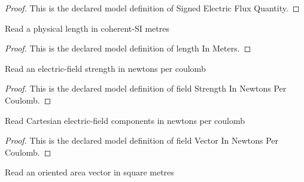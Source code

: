 \begin{proof}
  This is the declared model definition of Signed Electric Flux Quantity.
\end{proof}
\begin{definition}
  \label{def:physics:phyx-mini-0851:phyxminiproblems-problemphyxmini0851-lengthinmeters}
  Read a physical length in coherent-SI metres
\end{definition}
\begin{proof}
  This is the declared model definition of length In Meters.
\end{proof}
\begin{definition}
  \label{def:physics:phyx-mini-0851:phyxminiproblems-problemphyxmini0851-fieldstrengthinnewtonspercoulomb}
  Read an electric-field strength in newtons per coulomb
\end{definition}
\begin{proof}
  This is the declared model definition of field Strength In Newtons Per Coulomb.
\end{proof}
\begin{definition}
  \label{def:physics:phyx-mini-0851:phyxminiproblems-problemphyxmini0851-fieldvectorinnewtonspercoulomb}
  Read Cartesian electric-field components in newtons per coulomb
\end{definition}
\begin{proof}
  This is the declared model definition of field Vector In Newtons Per Coulomb.
\end{proof}
\begin{definition}
  \label{def:physics:phyx-mini-0851:phyxminiproblems-problemphyxmini0851-areavectorinsquaremeters}
  Read an oriented area vector in square metres
\end{definition}
